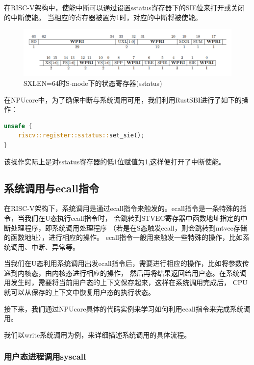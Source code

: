 在RISC-V架构中，使能中断可以通过设置sstatus寄存器下的SIE位来打开或关闭的中断使能。
当相应的寄存器被置为1时，对应的中断将被使能。

\begin{figure}[htb]
    \centering
    \includegraphics[width=\textwidth]{figures/03-03-SXLEN=64时S-mode下的状态寄存器(sstatus).png}
    \caption{
        SXLEN=64时S-mode下的状态寄存器(sstatus)
    }
    \label{fig:SXLEN=64时S-mode下的状态寄存器(sstatus)}
\end{figure}

在NPUcore中，为了确保中断与系统调用可用，我们利用RustSBI进行了如下的操作：

\begin{lstlisting}[language={Rust}]
unsafe {
    riscv::register::sstatus::set_sie();
}
\end{lstlisting}

该操作实际上是对sstatus寄存器的低1位赋值为1,这样便打开了中断使能。

\subsection{系统调用与ecall指令}

在RISC-V架构下，系统调用是通过ecall指令来触发的。ecall指令是一条特殊的指令，当我们在U态执行ecall指令时，
会跳转到STVEC寄存器中函数地址指定的中断处理程序，即系统调用处理程序
（若是在S态触发ecall，则会跳转到mtvec存储的函数地址），进行相应的操作。
ecall指令一般用来触发一些特殊的操作，比如系统调用、中断、异常等。

当我们在U态利用系统调用出发ecall指令后，需要进行相应的操作，比如将参数传递到内核态，由内核态进行相应的操作，
然后再将结果返回给用户态。在系统调用发生时，需要将当前用户态的上下文保存起来，这样在系统调用完成后，
CPU就可以从保存的上下文中恢复用户态的执行状态。

接下来，我们通过NPUcore具体的代码实例来学习如何利用ecall指令来完成系统调用。

我们以write系统调用为例，来详细描述系统调用的具体流程。

\subsubsection{用户态进程调用syscall}

